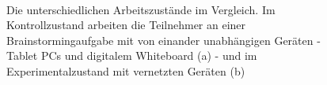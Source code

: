 \begin{figure}
        \myfloatalign
         \quad
         \\
        \caption[Die unterschiedlichen Arbeitszustände im Vergleich \newline \citep{Bastea-Forte:2007}]{Die unterschiedlichen Arbeitszustände im Vergleich. Im Kontrollzustand arbeiten die Teilnehmer an einer Brainstormingaufgabe mit von einander unabhängigen Geräten - Tablet PCs und digitalem Whiteboard (a) - und im Experimentalzustand mit vernetzten Geräten (b)}\label{fig:basteaConditionExperimental}
\end{figure}

